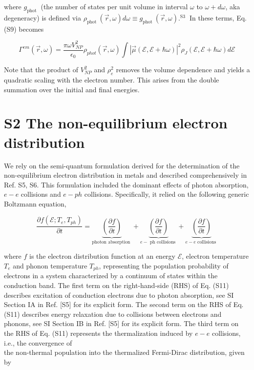 \documentclass[10pt]{article}
\begin{document}
where $g_{\text {phot }}$ (the number of states per unit volume in interval $\omega$ to $\omega+d \omega$, aka degeneracy) is defined via $\rho_{\text {phot }}(\vec{r}, \omega) d \omega \equiv g_{\text {phot }}(\vec{r}, \omega) .{ }^{\text {S3 }}$ In these terms, Eq. (S9) becomes


\begin{equation*}
\Gamma^{e m}(\vec{r}, \omega)=\frac{\pi \omega V_{N P}^{2}}{\epsilon_{0}} \rho_{p h o t}(\vec{r}, \omega) \int|\vec{\mu}(\mathcal{E}, \mathcal{E}+\hbar \omega)|^{2} \rho_{J}(\mathcal{E}, \mathcal{E}+\hbar \omega) d \mathcal{E} \tag{S10}
\end{equation*}


Note that the product of $V_{N P}^{2}$ and $\rho_{e}^{2}$ removes the volume dependence and yields a quadratic scaling with the electron number. This arises from the double summation over the initial and final energies.

\section*{S2 The non-equilibrium electron distribution}
We rely on the semi-quantum formulation derived for the determination of the non-equilibrium electron distribution in metals and described comprehensively in Ref. S5, S6. This formulation included the dominant effects of photon absorption, $e-e$ collisions and $e-p h$ collisions. Specifically, it relied on the following generic Boltzmann equation,


\begin{equation*}
\frac{\partial f\left(\mathcal{E} ; T_{e}, T_{p h}\right)}{\partial t}=\underbrace{\left(\frac{\partial f}{\partial t}\right)}_{\text {photon absorption }}+\underbrace{\left(\frac{\partial f}{\partial t}\right)}_{e-\text { ph collisions }}+\underbrace{\left(\frac{\partial f}{\partial t}\right)}_{e-e \text { collisions }} \tag{S11}
\end{equation*}


where $f$ is the electron distribution function at an energy $\mathcal{E}$, electron temperature $T_{e}$ and phonon temperature $T_{p h}$, representing the population probability of electrons in a system characterized by a continuum of states within the conduction band. The first term on the right-hand-side (RHS) of Eq. (S11) describes excitation of conduction electrons due to photon absorption, see SI Section IA in Ref. [S5] for its explicit form. The second term on the RHS of Eq. (S11) describes energy relaxation due to collisions between electrons and phonons, see SI Section IB in Ref. [S5] for its explicit form. The third term on the RHS of Eq. (S11) represents the thermalization induced by $e-e$ collisions, i.e., the convergence of\\
the non-thermal population into the thermalized Fermi-Dirac distribution, given by
\end{document}
